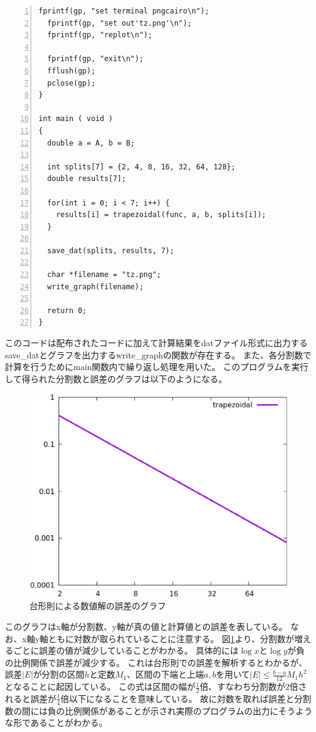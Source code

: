 \documentclass[a4paper]{jsarticle}
\begin{document}
\begin{lstlisting}[caption={\texttt{台形則による数値積分とその誤差を求めるコード}}, numbers=left, label={trapezoidal}]
  fprintf(gp, "set terminal pngcairo\n");
  fprintf(gp, "set out'tz.png'\n");
  fprintf(gp, "replot\n");

  fprintf(gp, "exit\n");
  fflush(gp);
  pclose(gp);
}

int main ( void )
{
  double a = A, b = B;

  int splits[7] = {2, 4, 8, 16, 32, 64, 128};
  double results[7];

  for(int i = 0; i < 7; i++) {
    results[i] = trapezoidal(func, a, b, splits[i]);
  }

  save_dat(splits, results, 7);

  char *filename = "tz.png";
  write_graph(filename);

  return 0;
}

\end{lstlisting}

このコードは配布されたコードに加えて計算結果をdatファイル形式に出力するsave\_datとグラフを出力するwrite\_graphの関数が存在する。
また、各分割数で計算を行うためにmain関数内で繰り返し処理を用いた。
このプログラムを実行して得られた分割数と誤差のグラフは以下のようになる。

\begin{figure}[H] 
  \includegraphics[width=\textwidth]{pictures/tz.eps}
  \caption{台形則による数値解の誤差のグラフ}
  \label{trapezoidal_graph}
\end{figure}

このグラフはx軸が分割数、y軸が真の値と計算値との誤差を表している。
なお、x軸y軸ともに対数が取られていることに注意する。
図\ref{trapezoidal_graph}より、分割数が増えるごとに誤差の値が減少していることがわかる。
具体的には\(\log{x}\)と\(\log{y}\)が負の比例関係で誤差が減少する。
これは台形則での誤差を解析するとわかるが、誤差\(|E|\)が分割の区間\(h\)と定数\(M_1\)、区間の下端と上端\(a, b\)を用いて\(|E| \leq \frac{b-a}{12}M_1h^2\)となることに起因している。
この式は区間の幅が\(\frac{1}{2}\)倍、すなわち分割数が\(2\)倍されると誤差が\(\frac{1}{4}\)倍以下になることを意味している。
故に対数を取れば誤差と分割数の間には負の比例関係があることが示され実際のプログラムの出力にそうような形であることがわかる。
\end{document}
